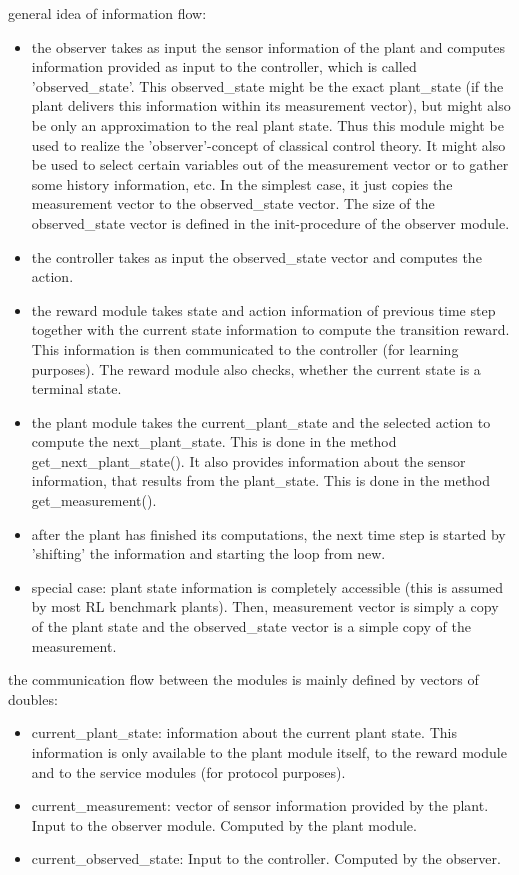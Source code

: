 \documentclass[a4paper,12pt,german]{article}
\newcommand{\ite}{\begin{itemize}}
\newcommand{\eti}{\end{itemize}}
\begin{document}
\item general idea of information flow: 
\ite
\item the observer takes as input the sensor information of the plant
  and computes information provided as input to the controller, which
  is called 'observed\_state'. This observed\_state might be the exact
  plant\_state (if the plant delivers this information within its
  measurement vector), but might also be only an approximation to the
  real plant state. Thus this module might be used to realize the
  'observer'-concept of classical control theory. It might also be used
  to select certain variables out of the  measurement vector or to 
  gather some history information, etc. In the simplest case, it just
  copies the measurement vector to the observed\_state vector.
  The size of the observed\_state vector is defined in the init-procedure
  of the observer module.
\item the controller takes as input the observed\_state vector and 
computes the action.
\item the reward module takes state and action information of previous
time step together with the current state information to compute the transition
reward. This information is then communicated to the controller (for learning
purposes). The reward module also checks, whether the current state is
a terminal state. 
\item the plant module takes the current\_plant\_state and the selected
action to compute the next\_plant\_state. This is done in the method
get\_next\_plant\_state(). It also provides information about the
sensor information, that results from the plant\_state. This is done
in the method get\_measurement().
\item after the plant has finished its computations, the next time
step is started by 'shifting' the information and starting the 
loop from new.
\item special case: plant state information is completely accessible (this
is assumed by most RL benchmark plants). Then, measurement vector is
simply a copy of the plant state and the observed\_state vector is
a simple copy of the measurement.
\eti





\item the communication flow between the modules is mainly defined by vectors of doubles:
\ite
\item current\_plant\_state: information about the current plant state. This information
is only available to the plant module itself, to the reward module and to the service modules 
(for protocol purposes).
\item current\_measurement: vector of sensor information provided by the plant.
Input to the observer module. Computed by the plant module.
\item current\_observed\_state: Input to the controller. Computed by the observer.
\eti
\end{document}
